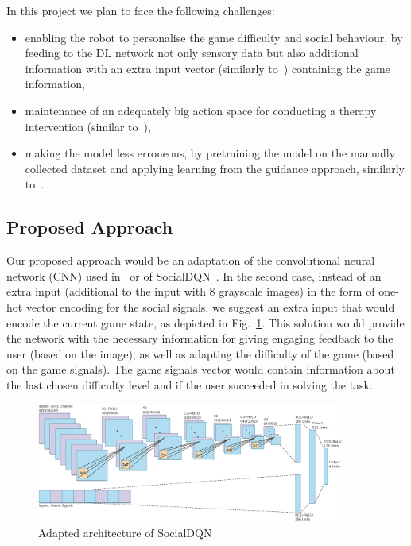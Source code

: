 \documentclass[thesis]{mas_proposal}
\begin{document}
In this project we plan to face the following challenges:
\begin{itemize}
	\item enabling the robot to personalise the game difficulty and social behaviour, by feeding to the DL network not only sensory data but also additional information with an extra input vector (similarly to~\cite{Qureshi2018,Belo2022,Hijaz2021}) containing the game information,
	\item maintenance of an adequately big action space for conducting a therapy intervention (similar to~\cite{stolarz2022learningbased,stolarz2022personalisedrobot,tsiakas2018task}),
	\item making the model less erroneous, by pretraining the model on the manually collected dataset and applying learning from the guidance approach, similarly to~\cite{senft2017supervised}.
\end{itemize}

\subsection{Proposed Approach}
\label{subsec:proposed_approach}

Our proposed approach would be an adaptation of the convolutional neural network (CNN) used in~\cite{Romeo2018,Romeo2019} or of SocialDQN~\cite{Belo2022}. In the second case, instead of an extra input (additional to the input with 8 grayscale images) in the form of one-hot vector encoding for the social signals, we suggest an extra input that would encode the current game state, as depicted in Fig.~\ref{fig:proposed_architecture}. This solution would provide the network with the necessary information for giving engaging feedback to the user (based on the image), as well as adapting the difficulty of the game (based on the game signals). The game signals vector would contain information about the last chosen difficulty level and if the user succeeded in solving the task.

\begin{figure}[htb!]
	\centering
	\includegraphics[width=0.9\textwidth]{images/architecture/proposed_architecture.png}
	\caption{Adapted architecture of SocialDQN~\cite{Belo2022}}
	\label{fig:proposed_architecture}
\end{figure}
\end{document}
